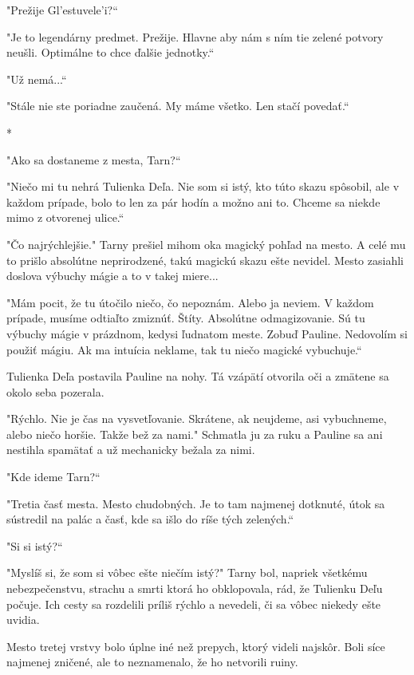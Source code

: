 \documentclass{book}
\begin{document}
"$ $Prežije Gl'estuvele'i?“

"$ $Je to legendárny predmet. Prežije. Hlavne aby nám s ním tie zelené potvory neušli. Optimálne to chce ďalšie jednotky.“

"$ $Už nemá...“

"$ $Stále nie ste poriadne zaučená. My máme všetko. Len stačí povedať.“

\begin{center}
*
\end{center}

"$ $Ako sa dostaneme z mesta, Tarn?“

"$ $Niečo mi tu nehrá Tulienka Deľa. Nie som si istý, kto túto skazu spôsobil, ale v každom prípade, bolo to len za pár hodín a možno ani to. Chceme sa niekde mimo z otvorenej ulice.“

"$ $Čo najrýchlejšie."$ $ Tarny prešiel mihom oka magický pohľad na mesto. A celé mu to prišlo absolútne neprirodzené, takú magickú skazu ešte nevidel. Mesto zasiahli doslova výbuchy mágie a to v takej miere...

"$ $Mám pocit, že tu útočilo niečo, čo nepoznám. Alebo ja neviem. V každom prípade, musíme odtiaľto zmiznúť. Štíty. Absolútne odmagizovanie. Sú tu výbuchy mágie v prázdnom, kedysi ľudnatom meste. Zobuď Pauline. Nedovolím si použiť mágiu. Ak ma intuícia neklame, tak tu niečo magické vybuchuje.“

Tulienka Deľa postavila Pauline na nohy. Tá vzápätí otvorila oči a zmätene sa okolo seba pozerala.

"$ $Rýchlo. Nie je čas na vysvetľovanie. Skrátene, ak neujdeme, asi vybuchneme, alebo niečo horšie. Takže bež za nami."$ $ Schmatla ju za ruku a Pauline sa ani nestihla spamätať a už mechanicky bežala za nimi.

"$ $Kde ideme Tarn?“

"$ $Tretia časť mesta. Mesto chudobných. Je to tam najmenej dotknuté, útok sa sústredil na palác a časť, kde sa išlo do ríše tých zelených.“

"$ $Si si istý?“

"$ $Myslíš si, že som si vôbec ešte niečím istý?"$ $ Tarny bol, napriek všetkému nebezpečenstvu, strachu a smrti ktorá ho obklopovala, rád, že Tulienku Deľu počuje. Ich cesty sa rozdelili príliš rýchlo a nevedeli, či sa vôbec niekedy ešte uvidia.

Mesto tretej vrstvy bolo úplne iné než prepych, ktorý videli najskôr. Boli síce najmenej zničené, ale to neznamenalo, že ho netvorili ruiny.
\end{document}
